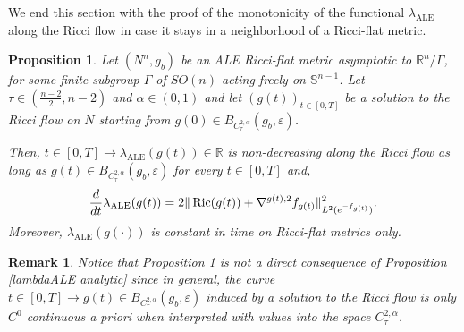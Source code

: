 \documentclass[a4paper,11pt,reqno]{amsart}
\newtheorem{prop}[defn]{Proposition}
\newtheorem{rk}[defn]{Remark}
\def\RR{\mathbb{R}}
\def\Ric{\mathop{\rm Ric}\nolimits}
\def\Ric{\mathop{\rm Ric}\nolimits}
\numberwithin{equation}{section}
\begin{document}
	We end this section with the proof of the monotonicity of the functional $\lambda_{\operatorname{ALE}}$ along the Ricci flow in case it stays in a neighborhood of a Ricci-flat metric. 	
		\begin{prop}\label{prop-mono-lambda}
		Let $(N^n,g_b)$ be an ALE Ricci-flat metric asymptotic to $\RR^n\slash\Gamma$, for some finite subgroup $\Gamma$ of $SO(n)$ acting freely on $\mathbb{S}^{n-1}$. Let $\tau\in\left(\frac{n-2}{2},n-2\right)$ and $\alpha\in (0,1)$ and let $(g(t))_{t\in[0,T]}$ be a solution to the Ricci flow on $N$ starting from $g(0)\in B_{C^{2,\alpha}_{\tau}}(g_b,\varepsilon)$.
		
		Then, $t\in[0,T]\rightarrow \lambda_{\operatorname{ALE}}(g(t))\in\RR$ is non-decreasing along the Ricci flow as long as $g(t)\in B_{C^{2,\alpha}_{\tau}}(g_b,\varepsilon)$ for every $t\in[0,T]$ and,
		\begin{equation}
		\frac{d}{dt}\lambda_{\operatorname{ALE}}(g(t))=2\|\Ric(g(t))+\nabla^{g(t),2}f_{g(t)}\|_{L^2(e^{-f_{g(t)}})}^2.\label{first-mono-lambda}
		\end{equation}
		Moreover, $\lambda_{\operatorname{ALE}}(g(\cdot))$ is constant in time on Ricci-flat metrics only.
		
	\end{prop}
	\begin{rk}
	Notice that Proposition \ref{prop-mono-lambda} is not a direct consequence of  Proposition \ref{lambdaALE analytic} since in general, the curve $t\in[0,T]\rightarrow g(t)\in B_{C^{2,\alpha}_{\tau}}(g_b,\varepsilon)$ induced by a solution to the Ricci flow is only $C^0$ continuous a priori when interpreted with values into the space $C^{2,\alpha}_{\tau}$.
	\end{rk}
	
\end{document}
